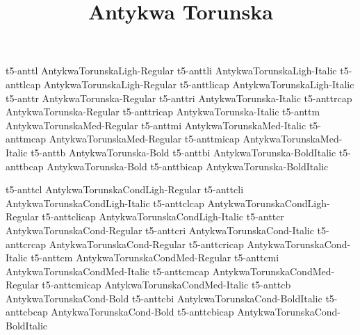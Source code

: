 \documentclass[test]{vnsample}
\title{Antykwa Torunska}
\begin{document}
\begin{shortsample}
      {t5-anttl}      {AntykwaTorunskaLigh-Regular}
     {t5-anttli}     {AntykwaTorunskaLigh-Italic}
     {t5-anttlcap}   {AntykwaTorunskaLigh-Regular}
   {t5-anttlicap}  {AntykwaTorunskaLigh-Italic}
      {t5-anttr}      {AntykwaTorunska-Regular}
     {t5-anttri}     {AntykwaTorunska-Italic}
     {t5-anttrcap}   {AntykwaTorunska-Regular}
   {t5-anttricap}  {AntykwaTorunska-Italic}
     {t5-anttm}      {AntykwaTorunskaMed-Regular}
    {t5-anttmi}     {AntykwaTorunskaMed-Italic}
    {t5-anttmcap}   {AntykwaTorunskaMed-Regular}
  {t5-anttmicap}  {AntykwaTorunskaMed-Italic}
      {t5-anttb}      {AntykwaTorunska-Bold}
     {t5-anttbi}     {AntykwaTorunska-BoldItalic}
     {t5-anttbcap}   {AntykwaTorunska-Bold}
   {t5-anttbicap}  {AntykwaTorunska-BoldItalic}
\end{shortsample}
\clearpage
\begin{shortsample}
     {t5-anttcl}     {AntykwaTorunskaCondLigh-Regular}
    {t5-anttcli}    {AntykwaTorunskaCondLigh-Italic}
    {t5-anttclcap}  {AntykwaTorunskaCondLigh-Regular}
  {t5-anttclicap} {AntykwaTorunskaCondLigh-Italic}
     {t5-anttcr}     {AntykwaTorunskaCond-Regular}
    {t5-anttcri}    {AntykwaTorunskaCond-Italic}
    {t5-anttcrcap}  {AntykwaTorunskaCond-Regular}
  {t5-anttcricap} {AntykwaTorunskaCond-Italic}
    {t5-anttcm}     {AntykwaTorunskaCondMed-Regular}
   {t5-anttcmi}    {AntykwaTorunskaCondMed-Italic}
   {t5-anttcmcap}  {AntykwaTorunskaCondMed-Regular}
 {t5-anttcmicap} {AntykwaTorunskaCondMed-Italic}
     {t5-anttcb}     {AntykwaTorunskaCond-Bold}
    {t5-anttcbi}    {AntykwaTorunskaCond-BoldItalic}
    {t5-anttcbcap}  {AntykwaTorunskaCond-Bold}
  {t5-anttcbicap} {AntykwaTorunskaCond-BoldItalic}
\end{shortsample}
\end{document}
